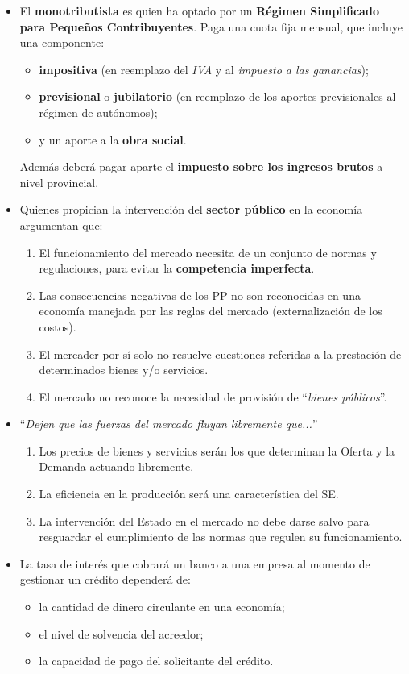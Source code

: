 \documentclass[10pt,a4paper]{article}
\begin{document}
\begin{itemize}
\item El \textbf{monotributista} es quien ha optado por un \textbf{Régimen Simplificado para Pequeños Contribuyentes}. Paga una cuota fija mensual, que incluye una componente:
\begin{itemize}
\item \textbf{impositiva} (en reemplazo del \textit{IVA} y al \textit{impuesto a las ganancias});
\item \textbf{previsional} o \textbf{jubilatorio} (en reemplazo de los aportes previsionales al régimen de autónomos);
\item y un aporte a la \textbf{obra social}.
\end{itemize}
Además deberá pagar aparte el \textbf{impuesto sobre los ingresos brutos} a nivel provincial.

\item Quienes propician la intervención del \textbf{sector público} en la economía argumentan que:
\begin{enumerate}
\item El funcionamiento del mercado necesita de un conjunto de normas y regulaciones, para evitar la \textbf{competencia imperfecta}.
\item Las consecuencias negativas de los PP no son reconocidas en una economía manejada por las reglas del mercado (externalización de los costos).
\item El mercader por sí solo no resuelve cuestiones referidas a la prestación de determinados bienes y/o servicios.
\item El mercado no reconoce la necesidad de provisión de ``\textit{bienes públicos}''.
\end{enumerate}

\item ``\textit{Dejen que las fuerzas del mercado fluyan libremente que...}''
\begin{enumerate}
\item Los precios de bienes y servicios serán los que determinan la Oferta y la Demanda actuando libremente.
\item La eficiencia en la producción será una característica del SE.
\item La intervención del Estado en el mercado no debe darse salvo para resguardar el cumplimiento de las normas que regulen su funcionamiento.
\end{enumerate}

\item La tasa de interés que cobrará un banco a una empresa al momento de gestionar un crédito dependerá de:
\begin{itemize}
\item la cantidad de dinero circulante en una economía;
\item el nivel de solvencia del acreedor;
\item la capacidad de pago del solicitante del crédito.
\end{itemize}
\end{itemize}
\end{document}
